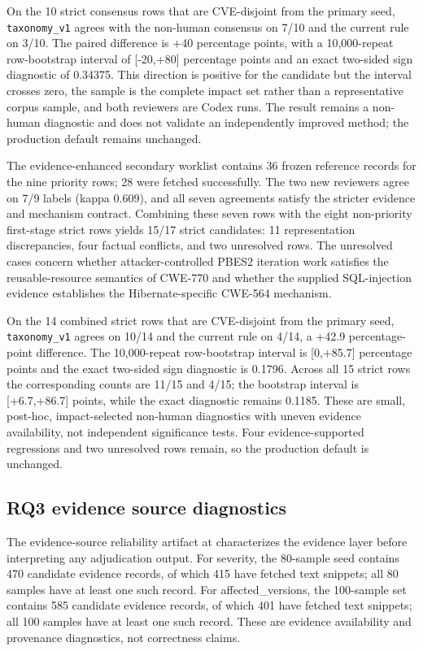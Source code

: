 On the 10 strict consensus rows that are CVE-disjoint from the primary seed, \texttt{taxonomy\_v1} agrees with the non-human consensus on 7/10 and the current rule on 3/10. The paired difference is +40 percentage points, with a 10,000-repeat row-bootstrap interval of [-20,+80] percentage points and an exact two-sided sign diagnostic of 0.34375. This direction is positive for the candidate but the interval crosses zero, the sample is the complete impact set rather than a representative corpus sample, and both reviewers are Codex runs. The result remains a non-human diagnostic and does not validate an independently improved method; the production default remains unchanged.

The evidence-enhanced secondary worklist contains 36 frozen reference records for the nine priority rows; 28 were fetched successfully. The two new reviewers agree on 7/9 labels (kappa 0.609), and all seven agreements satisfy the stricter evidence and mechanism contract. Combining these seven rows with the eight non-priority first-stage strict rows yields 15/17 strict candidates: 11 representation discrepancies, four factual conflicts, and two unresolved rows. The unresolved cases concern whether attacker-controlled PBES2 iteration work satisfies the reusable-resource semantics of CWE-770 and whether the supplied SQL-injection evidence establishes the Hibernate-specific CWE-564 mechanism.

On the 14 combined strict rows that are CVE-disjoint from the primary seed, \texttt{taxonomy\_v1} agrees on 10/14 and the current rule on 4/14, a +42.9 percentage-point difference. The 10,000-repeat row-bootstrap interval is [0,+85.7] percentage points and the exact two-sided sign diagnostic is 0.1796. Across all 15 strict rows the corresponding counts are 11/15 and 4/15; the bootstrap interval is [+6.7,+86.7] points, while the exact diagnostic remains 0.1185. These are small, post-hoc, impact-selected non-human diagnostics with uneven evidence availability, not independent significance tests. Four evidence-supported regressions and two unresolved rows remain, so the production default is unchanged.

\subsection{RQ3 evidence source diagnostics}

The evidence-source reliability artifact at  characterizes the evidence layer before interpreting any adjudication output. For severity, the 80-sample seed contains 470 candidate evidence records, of which 415 have fetched text snippets; all 80 samples have at least one such record. For affected\_versions, the 100-sample set contains 585 candidate evidence records, of which 401 have fetched text snippets; all 100 samples have at least one such record. These are evidence availability and provenance diagnostics, not correctness claims.

